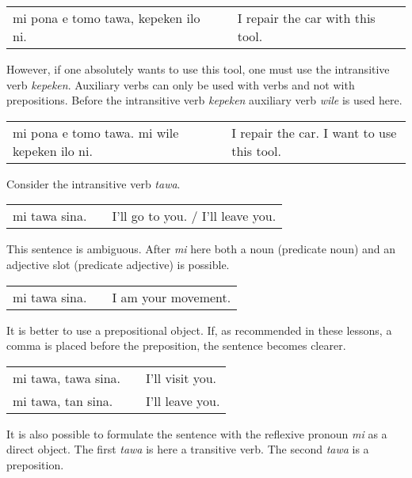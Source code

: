 \begin{supertabular}{p{5,5cm}|ll}
    mi pona e tomo tawa, kepeken ilo ni. &  & I repair the car with this tool. \\
\end{supertabular}

However, if one absolutely wants to use this tool, one must use the intransitive verb \textit{kepeken}.
Auxiliary verbs can only be used with verbs and not with prepositions.
Before the intransitive verb \textit{kepeken} auxiliary verb \textit{wile} is used here.

\begin{supertabular}{p{5,5cm}|ll}
    mi pona e tomo tawa. mi wile kepeken ilo ni. &  & I repair the car. I want to use this tool. \\
\end{supertabular}

Consider the intransitive verb \textit{tawa}.

\begin{supertabular}{p{5,5cm}|ll}
    mi tawa sina. &  & I'll go to you. / I'll leave you. \\
\end{supertabular}

This sentence is ambiguous.
After \textit{mi} here both a noun (predicate noun) and an adjective slot (predicate adjective) is possible.

\begin{supertabular}{p{5,5cm}|ll}
    mi tawa sina. &  & I am your movement. \\
\end{supertabular}

It is better to use a prepositional object.
If, as recommended in these lessons, a comma is placed before the preposition, the sentence becomes clearer.

\begin{supertabular}{p{5,5cm}|ll}
    mi tawa, tawa sina. &  & I'll visit you. \\
    mi tawa, tan sina.  &  & I'll leave you. \\
\end{supertabular}

It is also possible to formulate the sentence with the reflexive pronoun \textit{mi} as a direct object.
The first \textit{tawa} is here a transitive verb.
The second \textit{tawa} is a preposition.

